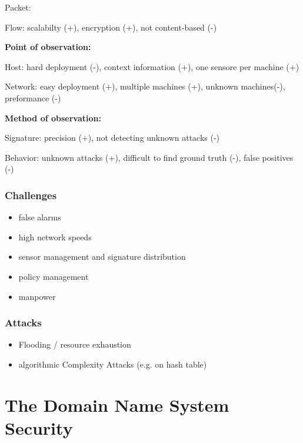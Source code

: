 \documentclass[fs, footer]{latex4ei}
\begin{document}
\begin{multicols*}{4}
{Packet:

Flow: scalabilty (+), encryption (+), not content-based (-)

\textbf{Point of observation:}

Host: hard deployment (-), context information (+), one sensore per machine (+)

Network: easy deployment (+), multiple machines (+), unknown machines(-), preformance (-)

\textbf{Method of observation:}

Signature: precision (+), not detecting unknown attacks (-)

Behavior: unknown attacks (+), difficult to find ground truth (-), false positives (-)

\subsubsection{Challenges}
\begin{itemize}
 	\item false alarms
 	\item high network speeds
 	\item sensor management and signature distribution
 	\item policy management
 	\item manpower
 \end{itemize}

 \subsubsection{Attacks}
 \begin{itemize}
 	\item Flooding / resource exhaustion
 	\item algorithmic Complexity Attacks (e.g. on hash table)

 \end{itemize}
}

\section{The Domain Name System Security}
\end{multicols*}
\end{document}
